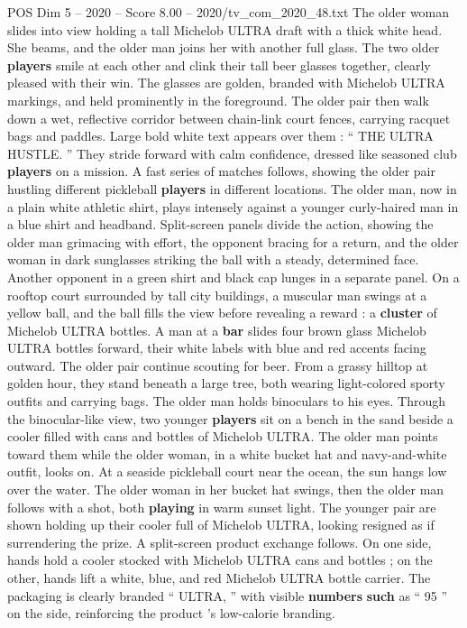 \begin{textsample}{POS Dim 5 – 2020 – Score 8.00 – 2020/tv\_com\_2020\_48.txt}
The older woman slides into view holding a tall Michelob ULTRA draft with a thick white head.
She beams, and the older man joins her with another full glass.
The two older \textbf{players} smile at each other and clink their tall beer glasses together, clearly pleased with their win.
The glasses are golden, branded with Michelob ULTRA markings, and held prominently in the foreground.
The older pair then walk down a wet, reflective corridor between chain-link court fences, carrying racquet bags and paddles.
Large bold white text appears over them : “ THE ULTRA HUSTLE. ” They stride forward with calm confidence, dressed like seasoned club \textbf{players} on a mission.
A fast series of matches follows, showing the older pair hustling different pickleball \textbf{players} in different locations.
The older man, now in a plain white athletic shirt, plays intensely against a younger curly-haired man in a blue shirt and headband.
Split-screen panels divide the action, showing the older man grimacing with effort, the opponent bracing for a return, and the older woman in dark sunglasses striking the ball with a steady, determined face.
Another opponent in a green shirt and black cap lunges in a separate panel.
On a rooftop court surrounded by tall city buildings, a muscular man swings at a yellow ball, and the ball fills the view before revealing a reward : a \textbf{cluster} of Michelob ULTRA bottles.
A man at a \textbf{bar} slides four brown glass Michelob ULTRA bottles forward, their white labels with blue and red accents facing outward.
The older pair continue scouting for beer.
From a grassy hilltop at golden hour, they stand beneath a large tree, both wearing light-colored sporty outfits and carrying bags.
The older man holds binoculars to his eyes.
Through the binocular-like view, two younger \textbf{players} sit on a bench in the sand beside a cooler filled with cans and bottles of Michelob ULTRA.
The older man points toward them while the older woman, in a white bucket hat and navy-and-white outfit, looks on.
At a seaside pickleball court near the ocean, the sun hangs low over the water.
The older woman in her bucket hat swings, then the older man follows with a shot, both \textbf{playing} in warm sunset light.
The younger pair are shown holding up their cooler full of Michelob ULTRA, looking resigned as if surrendering the prize.
A split-screen product exchange follows.
On one side, hands hold a cooler stocked with Michelob ULTRA cans and bottles ; on the other, hands lift a white, blue, and red Michelob ULTRA bottle carrier.
The packaging is clearly branded “ ULTRA, ” with visible \textbf{numbers} \textbf{such} as “ 95 ” on the side, reinforcing the product ’s low-calorie branding.

\end{textsample}

